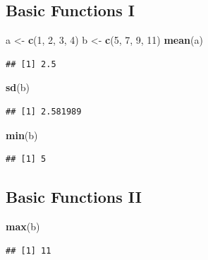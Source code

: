 \documentclass[
]{book}
\newenvironment{Shaded}{\begin{snugshade}}{\end{snugshade}}
\newcommand{\DecValTok}[1]{\textcolor[rgb]{0.00,0.00,0.81}{#1}}
\newcommand{\FunctionTok}[1]{\textcolor[rgb]{0.13,0.29,0.53}{\textbf{#1}}}
\newcommand{\NormalTok}[1]{#1}
\newcommand{\OtherTok}[1]{\textcolor[rgb]{0.56,0.35,0.01}{#1}}
\begin{document}
\subsection{Basic Functions I}\label{basic-functions-i}

\begin{Shaded}
\begin{Highlighting}[]
\NormalTok{a }\OtherTok{\textless{}{-}} \FunctionTok{c}\NormalTok{(}\DecValTok{1}\NormalTok{, }\DecValTok{2}\NormalTok{, }\DecValTok{3}\NormalTok{, }\DecValTok{4}\NormalTok{)}
\NormalTok{b }\OtherTok{\textless{}{-}} \FunctionTok{c}\NormalTok{(}\DecValTok{5}\NormalTok{, }\DecValTok{7}\NormalTok{, }\DecValTok{9}\NormalTok{, }\DecValTok{11}\NormalTok{)}
\FunctionTok{mean}\NormalTok{(a)}
\end{Highlighting}
\end{Shaded}

\begin{verbatim}
## [1] 2.5
\end{verbatim}

\begin{Shaded}
\begin{Highlighting}[]
\FunctionTok{sd}\NormalTok{(b)}
\end{Highlighting}
\end{Shaded}

\begin{verbatim}
## [1] 2.581989
\end{verbatim}

\begin{Shaded}
\begin{Highlighting}[]
\FunctionTok{min}\NormalTok{(b)}
\end{Highlighting}
\end{Shaded}

\begin{verbatim}
## [1] 5
\end{verbatim}

\subsection{Basic Functions II}\label{basic-functions-ii}

\begin{Shaded}
\begin{Highlighting}[]
\FunctionTok{max}\NormalTok{(b)}
\end{Highlighting}
\end{Shaded}

\begin{verbatim}
## [1] 11
\end{verbatim}
\end{document}
